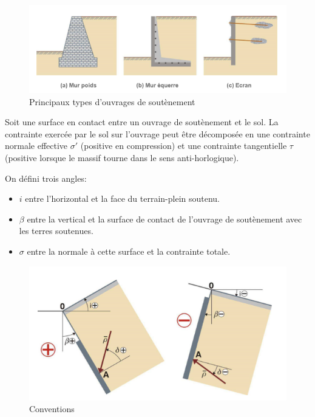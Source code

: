         \begin{figure}[h!]
            \centering
            \includegraphics[scale=0.8]{Holeyman/images/H45.PNG}
            \caption{Principaux types d’ouvrages de soutènement }
        \end{figure}
        
        Soit une surface en contact entre un ouvrage de soutènement et le sol. La contrainte exercée par le sol sur l'ouvrage peut être décomposée en une contrainte normale effective $\sigma'$ (positive en compression) et une contrainte tangentielle $\tau$ (positive lorsque le massif tourne dans le sens anti-horlogique). 
        
        On défini trois angles:
        \begin{itemize}
            \item $i$ entre l'horizontal et la face du terrain-plein soutenu.
            \item $\beta$ entre la vertical et la surface de contact de l'ouvrage de soutènement avec les terres soutenues.
            \item $\sigma$ entre la normale à cette surface et la contrainte totale.
        \end{itemize} 
        
        \begin{figure}[h!]
            \centering
            \includegraphics[scale=1]{Holeyman/images/H46.PNG}
            \caption{Conventions }
        \end{figure}
        
